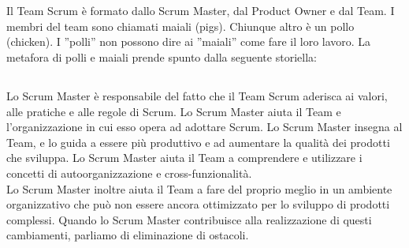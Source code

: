 \section*{\color{Blue}{I RUOLI IN SCRUM}}
\label{sec:roles}
Il Team Scrum \`e formato dallo Scrum Master, dal Product Owner e dal Team. I membri del team sono chiamati maiali
(pigs). Chiunque altro è un pollo (chicken). I ''polli'' non possono dire ai ''maiali'' come fare il loro lavoro.
La metafora di polli e maiali prende spunto dalla seguente storiella: 



\subsection*{\color{Blue}{LO SCRUM MASTER}}
\label{sec:scrummaster}
Lo Scrum Master \`e responsabile del fatto che il Team Scrum aderisca ai valori, alle pratiche e alle regole di Scrum.
Lo Scrum Master aiuta il Team e l'organizzazione in cui esso opera ad adottare Scrum. Lo Scrum Master insegna al Team,
e lo guida a essere pi\`u produttivo e ad aumentare la qualit\`a dei prodotti che sviluppa. Lo Scrum Master aiuta il
Team a comprendere e utilizzare i concetti di autoorganizzazione e cross-funzionalit\`a.\\ Lo Scrum Master inoltre aiuta il
Team a fare del proprio meglio in un ambiente organizzativo che pu\`o non essere ancora ottimizzato per lo sviluppo di
prodotti complessi. Quando lo Scrum Master contribuisce alla realizzazione di questi cambiamenti, parliamo di
eliminazione di ostacoli. 



